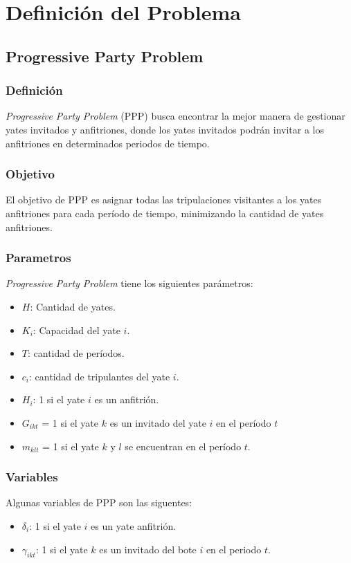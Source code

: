 \documentclass[letter, 10pt]{article}
\begin{document}
\section{Definición del Problema}
\subsection{Progressive Party Problem}
\subsubsection{Definición}
\textit{Progressive Party Problem} (PPP) busca encontrar la mejor manera de gestionar yates invitados y anfitriones, donde los yates invitados podrán invitar a los anfitriones en determinados periodos de tiempo. 

\subsubsection{Objetivo}
El objetivo de PPP es asignar todas las tripulaciones visitantes a los yates anfitriones para cada período de tiempo, minimizando la cantidad de yates anfitriones.

\subsubsection{Parametros}
\textit{Progressive Party Problem} tiene los siguientes parámetros:

\begin{itemize}
\item $H$: Cantidad de yates.
\item $K_i$: Capacidad del yate $i$.
\item $T$: cantidad de períodos.
\item $c_i$: cantidad de tripulantes del yate $i$.
\item $H_i$: 1 si el yate $i$ es un anfitrión.
\item $G_{ikt}$ = 1 si el yate $k$ es un invitado del yate $i$ en el período $t$
\item $m_{klt}$ = 1 si el yate $k$ y $l$ se encuentran en el período $t$.
\end{itemize}

\subsubsection{Variables}
Algunas variables de PPP son las siguentes:

    \begin{itemize}
      \item $\delta_i$: 1 si el yate $i$ es un yate anfitrión.
      \item $\gamma_{ikt}$: 1 si el yate $k$ es un invitado del bote $i$ en el periodo $t$.
    \end{itemize}
\end{document}
